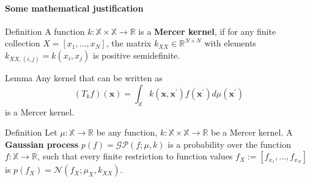 \begin{frame}{\insertsection}
    \framesubtitle{Some mathematical justification}

    \begin{block}{Definition}
        A function $k:\mathbb{X}\times\mathbb{X} \rightarrow \mathbb{R}$ is a \textcolor{UniBlue}{\textbf{Mercer kernel}}, if for any finite collection $X=\left[x_{1}, \dots, x_{N}\right]$, the matrix $k_{X X} \in \mathbb{R}^{N \times N}$ with elements $k_{X X,(i, j)}=k\left(x_{i}, x_{j}\right)$ is positive semidefinite.
    \end{block}
    
    \begin{block}{Lemma}
        Any kernel that can be written as
        \begin{equation*}
            \left(T_{k} f\right)(\mathbf{x})=\int_{\mathbb{X}} k\left(\mathbf{x}, \mathbf{x}^{\prime}\right) f\left(\mathbf{x}^{\prime}\right) d \mu\left(\mathbf{x}^{\prime}\right)
        \end{equation*}
        is a Mercer kernel.
    \end{block}

    \begin{block}{Definition}
        Let $\mu:\mathbb{X}\rightarrow \mathbb{R}$ be any function, $k:\mathbb{X}\times\mathbb{X} \rightarrow \mathbb{R}$ be a Mercer kernel. A \textcolor{UniBlue}{\textbf{Gaussian process}} $p(f)=\mathcal{G} \mathcal{P}(f ; \mu, k)$ is a probability over the function $f : \mathbb{X} \rightarrow \mathbb{R}$, such that every finite restriction to function values $f_{X} :=\left[f_{x_{1}}, \ldots, f_{x_{N}}\right]$ is  $p\left(f_{X}\right)=\mathcal{N}\left(f_{X} ; \mu_{X}, k_{X X}\right)$.
    \end{block}




\end{frame}
